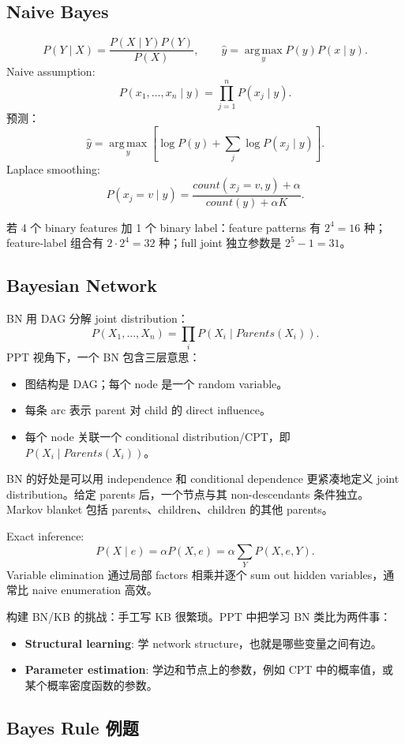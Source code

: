 \documentclass[UTF8,11pt,a4paper]{ctexart}
\newcommand{\argmax}{\operatorname*{arg\,max}}
\begin{document}
\subsection{Naive Bayes}

\[
P(Y\mid X)=\frac{P(X\mid Y)P(Y)}{P(X)},\qquad
\hat y=\argmax_y P(y)P(x\mid y).
\]
Naive assumption:
\[
P(x_1,\ldots,x_n\mid y)=\prod_{j=1}^nP(x_j\mid y).
\]
预测：
\[
\hat y=\argmax_y\left[\log P(y)+\sum_j\log P(x_j\mid y)\right].
\]
Laplace smoothing:
\[
P(x_j=v\mid y)=\frac{count(x_j=v,y)+\alpha}{count(y)+\alpha K}.
\]

若 4 个 binary features 加 1 个 binary label：feature patterns 有 $2^4=16$ 种；feature-label 组合有 $2\cdot2^4=32$ 种；full joint 独立参数是 $2^5-1=31$。

\subsection{Bayesian Network}

BN 用 DAG 分解 joint distribution：
\[
P(X_1,\ldots,X_n)=\prod_iP(X_i\mid Parents(X_i)).
\]
PPT 视角下，一个 BN 包含三层意思：
\begin{itemize}
\item 图结构是 DAG；每个 node 是一个 random variable。
\item 每条 arc 表示 parent 对 child 的 direct influence。
\item 每个 node 关联一个 conditional distribution/CPT，即 $P(X_i\mid Parents(X_i))$。
\end{itemize}

BN 的好处是可以用 independence 和 conditional dependence 更紧凑地定义 joint distribution。给定 parents 后，一个节点与其 non-descendants 条件独立。Markov blanket 包括 parents、children、children 的其他 parents。

Exact inference:
\[
P(X\mid e)=\alpha P(X,e)=\alpha\sum_Y P(X,e,Y).
\]
Variable elimination 通过局部 factors 相乘并逐个 sum out hidden variables，通常比 naive enumeration 高效。

构建 BN/KB 的挑战：手工写 KB 很繁琐。PPT 中把学习 BN 类比为两件事：
\begin{itemize}
\item \textbf{Structural learning}: 学 network structure，也就是哪些变量之间有边。
\item \textbf{Parameter estimation}: 学边和节点上的参数，例如 CPT 中的概率值，或某个概率密度函数的参数。
\end{itemize}

\subsection{Bayes Rule 例题}
\end{document}
